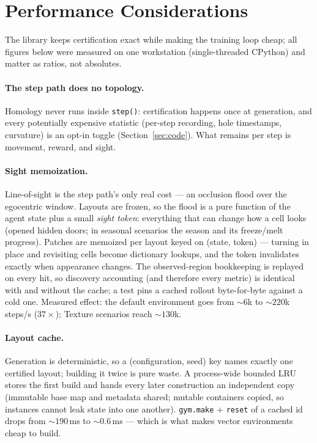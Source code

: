 \documentclass[11pt]{article}
\begin{document}
\section{Performance Considerations}
\label{sec:performance}

The library keeps certification exact while making the training loop
cheap; all figures below were measured on one workstation
(single-threaded CPython) and matter as ratios, not absolutes.

\paragraph{The step path does no topology.} Homology never runs
inside \texttt{step()}: certification happens once at generation,
and every potentially expensive statistic (per-step recording, hole
timestamps, curvature) is an opt-in toggle
(Section~\ref{sec:code}). What remains per step is movement, reward,
and sight.

\paragraph{Sight memoization.} Line-of-sight is the step path's only
real cost --- an occlusion flood over the egocentric window. Layouts
are frozen, so the flood is a pure function of the agent state plus a
small \emph{sight token}: everything that can change how a cell
looks (opened hidden doors; in seasonal scenarios the season and its
freeze/melt progress). Patches are memoized per layout keyed on
(state, token) --- turning in place and revisiting cells become
dictionary lookups, and the token invalidates exactly when appearance
changes. The observed-region bookkeeping is replayed on every hit, so
discovery accounting (and therefore every metric) is identical with
and without the cache; a test pins a cached rollout byte-for-byte
against a cold one. Measured effect: the default environment goes
from ${\sim}6$k to ${\sim}220$k steps/s ($37\times$); Texture
scenarios reach ${\sim}130$k.

\paragraph{Layout cache.} Generation is deterministic, so a
(configuration, seed) key names exactly one certified layout;
building it twice is pure waste. A process-wide bounded LRU stores
the first build and hands every later construction an independent
copy (immutable base map and metadata shared; mutable containers
copied, so instances cannot leak state into one another).
\texttt{gym.make} + \texttt{reset} of a cached id drops from
${\sim}190$\,ms to ${\sim}0.6$\,ms --- which is what makes vector
environments cheap to build.
\end{document}
